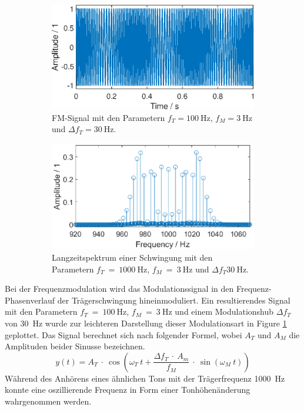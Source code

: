 \begin{figure}[h]
    \centering
\begin{subfigure}{.49\textwidth} 
  \centering
  \includegraphics[width=.85\linewidth]{ue4/FM_100_3.eps} %
  \caption{FM-Signal mit den Parametern $f_T = \SI{100}{\Hz}$, $f_M = \SI{3}{\Hz}$ und $\Delta f_T = \SI{30}{\Hz}$.}
  \label{fig:FM_100_3}
  \end{subfigure}%
\hfill
\begin{subfigure}{.49\textwidth} 
  \centering
  \includegraphics[width=\linewidth]{ue4/FM_1000_3_fft.eps} %
  \caption{Langzeitspektrum einer Schwingung mit den Parametern $f_T\ =\ \SI{1000}{\Hz}$, $f_M\ =\ \SI{3}{\Hz}$ und $\Delta f_T \SI{30}{\Hz}$.}
  \label{fig:FM_1000_3_fft}
\end{subfigure}
    \caption{}
    \label{fig:AM}
\end{figure}

Bei der Frequenzmodulation wird das Modulationssignal in den Frequenz-Phasenverlauf der Trägerschwingung hineinmoduliert. Ein resultierendes Signal mit den Parametern $f_T\ =\ \SI{100}{\Hz}$, $f_M\ =\ \SI{3}{\Hz}$ und einem Modulationshub $\Delta f_T$ von \SI{30}{\Hz} wurde zur leichteren Darstellung dieser Modulationsart in Figure \ref{fig:FM_100_3} geplottet. Das Signal berechnet sich nach folgender Formel, wobei $A_T$ und $A_M$ die Amplituden beider Sinusse bezeichnen.
\begin{equation}
    y(t) = A_T\ \cdot\ \cos\left(\omega_T\ t + \frac{\Delta f_T\ \cdot\ A_m}{f_M}\ \cdot\ \sin(\omega_M\ t)\right)
\end{equation}
Während des Anhörens eines ähnlichen Tons mit der Trägerfrequenz \SI{1000}{\Hz} konnte eine oszillierende Frequenz in Form einer Tonhöhenänderung wahrgenommen werden.

